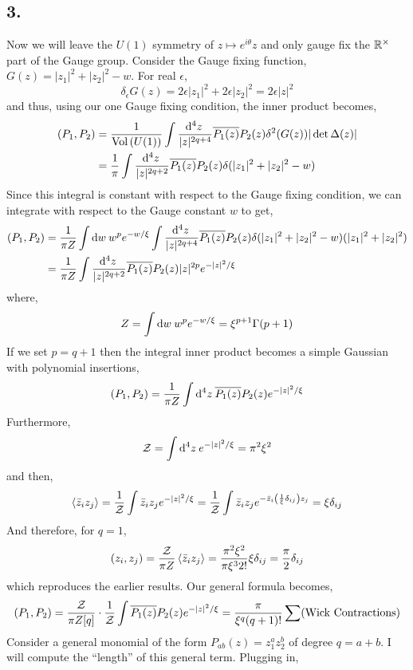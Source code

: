 \documentclass[12pt]{article}
\begin{document}
\subsection*{3.}

Now we will leave the $U(1)$ symmetry of $z \mapsto e^{i \theta} z$ and only gauge fix the $\mathbb{R}^\times$ part of the Gauge group. Consider the Gauge fixing function, $G(z) = |z_1|^2 + |z_2|^2 - w$. For real $\epsilon$,
\[ \delta_{\epsilon} G(z) = 2 \epsilon |z_1|^2 + 2 \epsilon |z_2|^2 = 2 \epsilon |z|^2 \]  
and thus, using our one Gauge fixing condition, the inner product becomes,
\begin{align*} 
(P_1, P_2) & = \frac{1}{\mathrm{Vol}\left(U(1)\right)} \int \frac{\mathrm{d}^{4} z \:}{|z|^{2q + 4}} \overline{P_1(z)} P_2(z) \delta^2(G(z)) |\det{\Delta(z)} | 
\\
& = \frac{1}{\pi} \int \frac{\mathrm{d}^{4} z \:}{|z|^{2q + 2}} \overline{P_1(z)} P_2(z) \delta(|z_1|^2 + |z_2|^2 - w) 
\end{align*}
Since this integral is constant with respect to the Gauge fixing condition, we can integrate with respect to the Gauge constant $w$ to get,
\begin{align*}
(P_1, P_2) & = \frac{1}{\pi Z} \int \mathrm{d}w \: w^p e^{-w / \xi} \int \frac{\mathrm{d}^{4} z \:}{|z|^{2q + 4}} \overline{P_1(z)} P_2(z) \delta(|z_1|^2 + |z_2|^2 - w) (|z_1|^2 + |z_2|^2) 
\\
& = \frac{1}{\pi Z} \int \frac{\mathrm{d}^{4} z \:}{|z|^{2q + 2}} \overline{P_1(z)} P_2(z) |z|^{2p} e^{-|z|^2/\xi}
\end{align*}
where,
\[ Z = \int \mathrm{d}w \: w^p e^{-w/\xi} =  \xi^{p+1} \Gamma(p + 1) \]
If we set  $p = q + 1$ then the integral inner product becomes a simple Gaussian with polynomial insertions,
\[ (P_1, P_2) = \frac{1}{\pi Z} \int \mathrm{d}^{4} z \: \overline{P_1(z)} P_2(z) e^{-|z|^2/\xi} \]
Furthermore, 
\[ 
\mathcal{Z} = \int \mathrm{d}^{4} z \: e^{-|z|^2 / \xi} = \pi^2 \xi^2 \]
and then,
\[ \left< \bar{z}_i z_j \right> = \frac{1}{\mathcal{Z}} \int \bar{z}_i z_j e^{-|z|^2 / \xi} = \frac{1}{\mathcal{Z}} \int \bar{z}_i z_j e^{-\bar{z}_i \left( \frac{1}{\xi} \delta_{ij} \right) z_j} = \xi \delta_{ij} \]
And therefore, for $q = 1$,
\[ (z_i, z_j) = \frac{\mathcal{Z}}{\pi Z} \left< \bar{z}_i z_j \right> = \frac{\pi^2 \xi^2}{\pi \xi^3 2!} \xi \delta_{ij} = \frac{\pi}{2} \delta_{ij} \] 
which reproduces the earlier results. Our general formula becomes,
\[ (P_1, P_2) = \frac{\mathcal{Z}}{\pi Z[q]} \cdot \frac{1}{\mathcal{Z}} \int \overline{P_1(z)} P_2(z) e^{-|z|^2 / \xi} = \frac{\pi}{\xi^q (q+1)!} \sum (\text{Wick Contractions}) \]
Consider a general monomial of the form $P_{ab}(z) = z_1^a z_2^b$ of degree $q = a + b$. I will compute the ``length'' of this general term. Plugging in,
\end{document}
